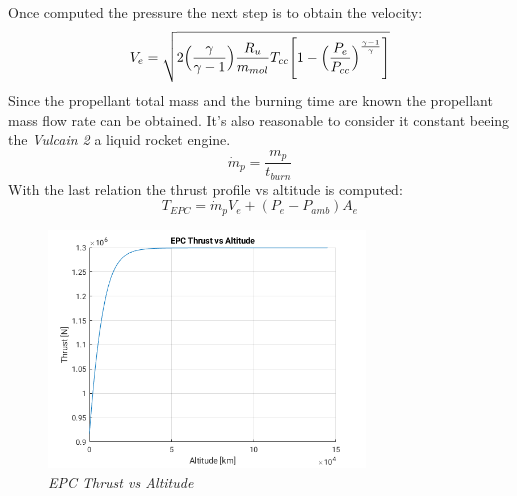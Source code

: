 \documentclass[12pt,fleqn,openany]{book} %
\begin{document}
Once computed the pressure the next step is to obtain the velocity:
\begin{equation}
 V_e=\sqrt{2\Bigl(\frac{\gamma}{\gamma-1}\Bigr)\frac{R_u}{m_{mol}}T_{cc}\Biggl[1-\Bigl(\frac{P_e}{P_{cc}}\Bigr)^{\frac{\gamma-1}{\gamma}}\Biggr]}
\end{equation}
Since the propellant total mass and the burning time are known the propellant mass flow rate can be obtained. It's also reasonable to consider it constant beeing the \textit{Vulcain 2} a liquid rocket engine.
\begin{equation}
 \dot{m}_p = \frac{m_p}{t_{burn}}
\end{equation}
With the last relation the thrust profile vs altitude is computed:
\begin{equation}
 T_{EPC}=\dot{m}_pV_e+(P_e-P_{amb})A_e
\end{equation}
\begin{figure}[h]
 \centering
 \includegraphics[width=0.75\textwidth]{EPC_T}
 \caption{\emph{EPC Thrust vs Altitude}}
\end{figure}
\end{document}
